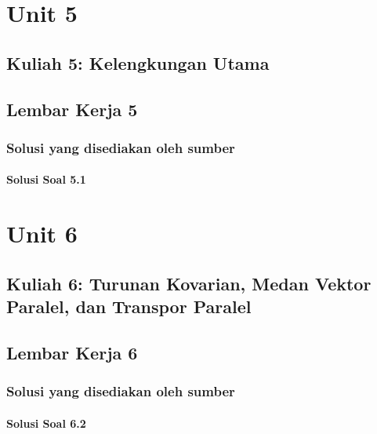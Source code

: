 \documentclass[11pt,a4paper,oneside]{book}
\begin{document}
\part{Unit 5}
\chapter[Kuliah 5]{Kuliah 5: Kelengkungan Utama}


\chapter{Lembar Kerja 5}


\section*{Solusi yang disediakan oleh sumber}
\subsection*{Solusi Soal 5.1}


\part{Unit 6}
\chapter[Kuliah 6]{Kuliah 6: Turunan Kovarian, Medan Vektor Paralel, dan Transpor Paralel}


\chapter{Lembar Kerja 6}


\section*{Solusi yang disediakan oleh sumber}
\subsection*{Solusi Soal 6.2}

\end{document}
